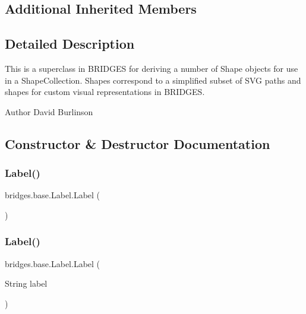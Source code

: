 \subsection*{Additional Inherited Members}


\subsection{Detailed Description}
This is a superclass in B\+R\+I\+D\+G\+ES for deriving a number of Shape objects for use in a Shape\+Collection. Shapes correspond to a simplified subset of S\+VG paths and shapes for custom visual representations in B\+R\+I\+D\+G\+ES. 

\begin{DoxyAuthor}{Author}
David Burlinson 
\end{DoxyAuthor}


\subsection{Constructor \& Destructor Documentation}
\mbox{\label{classbridges_1_1base_1_1_label_adaed1c29dc02eb0f77d772b256b9eae4}} 
\subsubsection{\texorpdfstring{Label()}{Label()}\hspace{0.1cm}{\footnotesize\ttfamily [1/2]}}
{\footnotesize\ttfamily bridges.\+base.\+Label.\+Label (\begin{DoxyParamCaption}{ }\end{DoxyParamCaption})}

\mbox{\label{classbridges_1_1base_1_1_label_a0ffb2cdafae3f2c21e0925f2fe23df87}} 
\subsubsection{\texorpdfstring{Label()}{Label()}\hspace{0.1cm}{\footnotesize\ttfamily [2/2]}}
{\footnotesize\ttfamily bridges.\+base.\+Label.\+Label (\begin{DoxyParamCaption}\item[{String}]{label }\end{DoxyParamCaption})}



